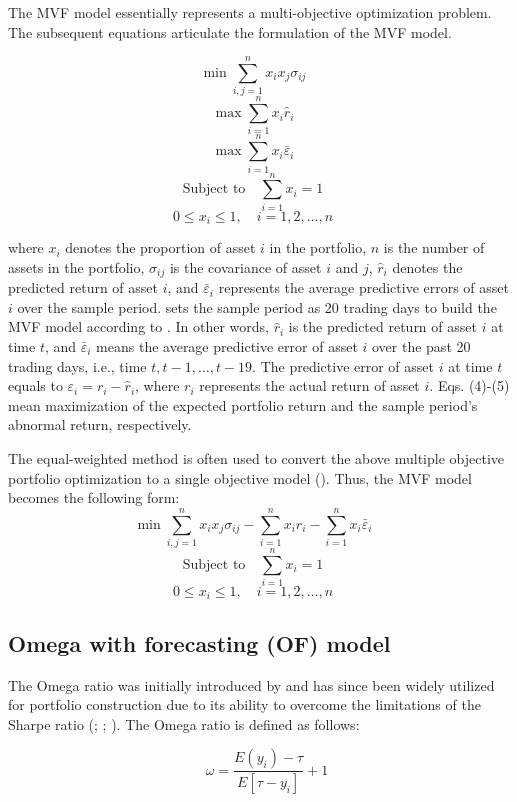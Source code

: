 The MVF model essentially represents a multi-objective optimization problem. The subsequent equations articulate the formulation of the MVF model.

\[
\min \sum_{i,j=1}^{n} x_i x_j \sigma_{ij} \quad
\]
\[
\max \sum_{i=1}^{n} x_i \hat{r}_i \quad
\]
\[
\max \sum_{i=1}^{n} x_i \bar{\varepsilon}_i \quad
\]
\[
\text{Subject to} \quad \sum_{i=1}^{n} x_i = 1 \quad
\]
\[
0 \leq x_i \leq 1, \quad i=1,2,\ldots,n \quad
\]

where $x_i$ denotes the proportion of asset $i$ in the portfolio, $n$ is the number of assets in the portfolio, $\sigma_{ij}$ is the covariance of asset $i$ and $j$, $\hat{r}_i$ denotes the predicted return of asset $i$, and $\bar{\varepsilon}_i$ represents the average predictive errors of asset $i$ over the sample period. \cite{Ma2021} sets the sample period as 20 trading days to build the MVF model according to \cite{Yu2020}. In other words, $\hat{r}_i$ is the predicted return of asset $i$ at time $t$, and $\bar{\varepsilon}_i$ means the average predictive error of asset $i$ over the past 20 trading days, i.e., time $t, t-1, \ldots, t-19$. The predictive error of asset $i$ at time $t$ equals to $\varepsilon_i = r_i - \hat{r}_i$, where $r_i$ represents the actual return of asset $i$. Eqs. (4)-(5) mean maximization of the expected portfolio return and the sample period's abnormal return, respectively.

The equal-weighted method is often used to convert the above multiple objective portfolio optimization to a single objective model (\cite{Yu2020}). Thus, the MVF model becomes the following form:
\[
\min \sum_{i,j=1}^{n} x_i x_j \sigma_{ij} - \sum_{i=1}^{n} x_i \hat{r}_i - \sum_{i=1}^{n} x_i \bar{\varepsilon}_i \quad 
\]
\[
\text{Subject to} \quad \sum_{i=1}^{n} x_i = 1 \quad 
\]
\[
0 \leq x_i \leq 1, \quad i=1,2,\ldots,n \quad 
\]

\subsection{Omega with forecasting (OF) model}

The Omega ratio was initially introduced by \cite{keating2002universal} and has since been widely utilized for portfolio construction due to its ability to overcome the limitations of the Sharpe ratio (\cite{Gilli2011}; \cite{Kane2009}; \cite{Kapsos2014}). The Omega ratio is defined as follows:

\[
    \quad \omega = \frac{E(y_i) - \tau}{E\left [ \tau - y_i \right ]}  + 1
\]


